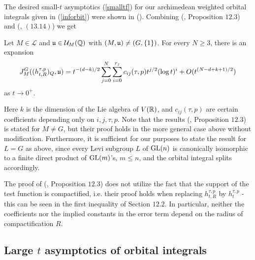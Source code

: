 The desired small-$t$ asymptotics (\ref{smalltf}) for our archimedean weighted orbital integrals given in (\ref{inforbit}) were shown in (\cite{MzM1}). Combining (\cite{MzM1}, Proposition $12.3$) and (\cite{MzM1}, $(13.14)$) we get
\begin{prop}\label{orbitsmallt}
Let $M\in \mathcal{L}$ and $\mathfrak{u}\in \mathcal{U}_M(\mathbb{Q})$ with $(M,\mathfrak{u})\neq (G,\lbrace 1\rbrace)$. For every $N\geq 3$, there is an expansion
    \begin{align*}
        J^G_M((h_{t,R}^{\tau,p})_Q,\mathfrak{u}) = t^{-(d-k)/2}\sum_{j=0}^N\sum^{r_j}_{i=0}c_{ij}(\tau,p)t^{j/2}(\log t)^i+O(t^{(N-d+k+1)/2})
    \end{align*}
    as $t\to 0^+$.
\end{prop}
\noindent Here $k$ is the dimension of the Lie algebra of $V(\mathbb{R})$, and $c_{ij}(\tau,p)$ are certain coefficients depending only on $i,j,\tau,p$. Note that the results (\cite{MzM1}, Proposition $12.3$) is stated for $M\neq G$, but their proof holds in the more general case above without modification. Furthermore, it is sufficient for our purposes to state the result for $L=G$ as above, since every Levi subgroup $L$ of $\operatorname{GL}(n)$ is canonically isomorphic to a finite direct product of $\operatorname{GL}(m)$'s, $m\leq n$, and the orbital integral splits accordingly.

\begin{rmk}\label{independentR}
    The proof of (\cite{MzM1}, Proposition $12.3$) does not utilize the fact that the support of the test function is compactified, i.e. their proof holds when replacing $h_{t,R}^{\tau,p}$ by $h_t^{\tau,p}$ - this can be seen in the first inequality of Section $12.2$. In particular, neither the coefficients nor the implied constants in the error term depend on the radius of compactification $R$. 
\end{rmk}


\subsection{Large $t$ asymptotics of orbital integrals}


